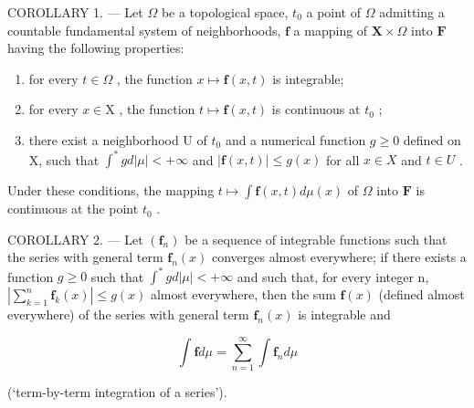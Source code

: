 COROLLARY 1. --- Let \(\Omega\) be a topological space, \(t_0\) a point of \(\Omega\) admitting a countable fundamental system of neighborhoods, \(\mathbf{f}\) a mapping of \(\mathbf{X} \times \Omega\) into \(\mathbf{F}\) having the following properties:

\begin{enumerate}
\def\labelenumi{\alph{enumi})}
\item
  for every \(t \in \Omega\) , the function \(x \mapsto \mathbf{f}(x, t)\) is integrable;
\item
  for every \(x \in \mathrm{X}\) , the function \(t \mapsto \mathbf{f}(x, t)\) is continuous at \(t_0\) ;
\item
  there exist a neighborhood U of \(t_0\) and a numerical function \(g \geqslant 0\) defined on X, such that \(\int^{*} g d|\mu| < +\infty\) and \(|\mathbf{f}(x,t)| \leqslant g(x)\) for all \(x \in X\) and \(t \in U\) .
\end{enumerate}

Under these conditions, the mapping \(t \mapsto \int \mathbf{f}(x,t) d\mu(x)\) of \(\Omega\) into \(\mathbf{F}\) is continuous at the point \(t_0\) .

COROLLARY 2. --- Let \((\mathbf{f}_{n})\) be a sequence of integrable functions such that the series with general term \(\mathbf{f}_{n}(x)\) converges almost everywhere; if there exists a function \(g \geqslant 0\) such that \(\int^{*} g d|\mu| < +\infty\) and such that, for every integer n, \(\left|\sum_{k=1}^{n} \mathbf{f}_{k}(x)\right| \leqslant g(x)\) almost everywhere, then the sum \(\mathbf{f}(x)\) (defined almost everywhere) of the series with general term \(\mathbf{f}_{n}(x)\) is integrable and

\[
\int \mathbf {f} d \mu = \sum_ {n = 1} ^ {\infty} \int \mathbf {f} _ {n} d \mu\tag{12}
\]

(`term-by-term integration of a series').

